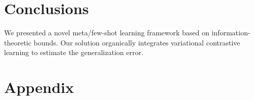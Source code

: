 \documentclass[nohyperref]{article}
\theoremstyle{plain}
\theoremstyle{definition}
\theoremstyle{remark}
\begin{document}



\section{Conclusions}

We presented a novel meta/few-shot learning framework based on information-theoretic bounds. Our solution organically integrates variational contrastive learning to estimate the generalization error. 








\newpage
\appendix
\onecolumn

\section*{Appendix}
\end{document}
